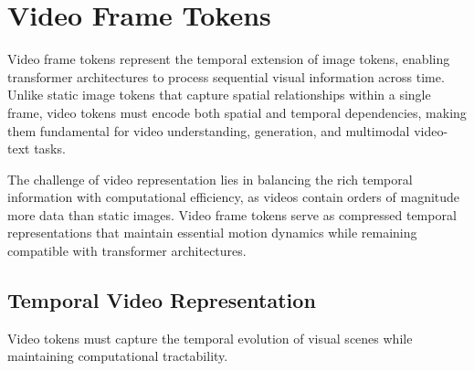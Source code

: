 
\section{Video Frame Tokens}

Video frame tokens represent the temporal extension of image tokens, enabling transformer architectures to process sequential visual information across time. Unlike static image tokens that capture spatial relationships within a single frame, video tokens must encode both spatial and temporal dependencies, making them fundamental for video understanding, generation, and multimodal video-text tasks.
\begin{comment}
Feedback: This is a good start. To emphasize the core challenge, you could add: "The primary difficulty in designing video tokens is managing the explosion of data: a few seconds of video can contain hundreds of high-resolution frames. Therefore, the central goal is to create representations that capture the essential motion and semantic changes over time without becoming computationally intractable."
\end{comment}

The challenge of video representation lies in balancing the rich temporal information with computational efficiency, as videos contain orders of magnitude more data than static images. Video frame tokens serve as compressed temporal representations that maintain essential motion dynamics while remaining compatible with transformer architectures.

\subsection{Temporal Video Representation}

Video tokens must capture the temporal evolution of visual scenes while maintaining computational tractability.

